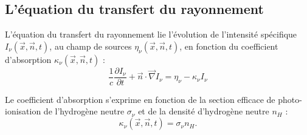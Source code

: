 \subsection{L'équation du transfert du rayonnement}

L'équation du transfert du rayonnement lie l'évolution de l'intensité spécifique $I_\nu(\vec{x},\vec{n},t)$, au champ de sources $\eta_\nu(\vec{x},\vec{n},t)$, en fonction du coefficient d'absorption $\kappa_\nu(\vec{x},\vec{n},t)$ :
\begin{equation}
\frac{1}{c} \frac{\partial I_\nu}{\partial t} + \vec{n}\cdot \vec{\nabla} I_\nu = \eta_\nu - \kappa_\nu I_\nu 
\label{eq:rad}
\end{equation}

Le coefficient d'absorption s'exprime en fonction de la section efficace de photo-ionisation de l'hydrogène neutre $\sigma_\nu$ et de la densité d'hydrogène neutre $n_H$ :
\begin{equation}
\kappa_\nu(\vec{x},\vec{n},t) = \sigma_\nu n_H.
\end{equation}

